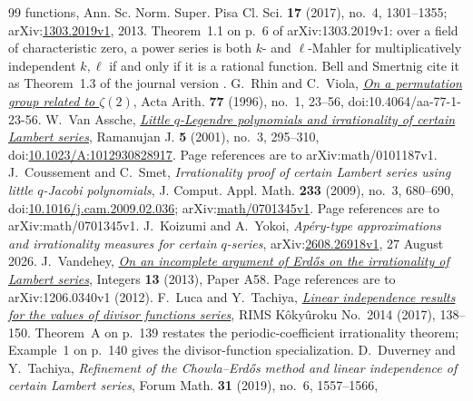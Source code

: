 \begin{thebibliography}{99}
{{  functions}}, Ann. Sc. Norm. Super. Pisa Cl. Sci. \textbf{17} (2017), no.~4,
  1301--1355; arXiv:\href{https://arxiv.org/abs/1303.2019v1}{1303.2019v1}, 2013.
  Theorem~1.1 on p.~6 of arXiv:1303.2019v1: over a field of characteristic
  zero, a power series is both \(k\)- and \(\ell\)-Mahler for multiplicatively
  independent \(k,\ell\) if and only if it is a rational function.  Bell and
  Smertnig cite it as Theorem~1.3 of the journal version
  \cite[Thm.~2.5, p.~5]{bellsmertnig2026}.
 G.~Rhin and C.~Viola,
  \href{https://geodesic.mathdoc.fr/articles/10.4064/aa-77-1-23-56/}
  {\emph{On a permutation group related to $\zeta(2)$}},
  Acta Arith. \textbf{77} (1996), no.~1, 23--56,
  doi:10.4064/aa-77-1-23-56.
 W.~Van Assche,
  \href{https://arxiv.org/abs/math/0101187v1}{\emph{Little \(q\)-Legendre
  polynomials and irrationality of certain Lambert series}},
  Ramanujan J. \textbf{5} (2001), no.~3, 295--310,
  doi:\href{https://doi.org/10.1023/A:1012930828917}{10.1023/A:1012930828917}.
  Page references are to arXiv:math/0101187v1.
 J.~Coussement and C.~Smet, \emph{Irrationality
  proof of certain Lambert series using little \(q\)-Jacobi polynomials},
  J. Comput. Appl. Math. \textbf{233} (2009), no.~3, 680--690,
  doi:\href{https://doi.org/10.1016/j.cam.2009.02.036}{10.1016/j.cam.2009.02.036};
  arXiv:\href{https://arxiv.org/abs/math/0701345v1}{math/0701345v1}.
  Page references are to arXiv:math/0701345v1.
 J.~Koizumi and A.~Yokoi, \emph{Ap\'ery-type
  approximations and irrationality measures for certain \(q\)-series},
  arXiv:\href{https://arxiv.org/abs/2608.26918v1}{2608.26918v1},
  27 August 2026.
 J.~Vandehey,
  \href{https://arxiv.org/abs/1206.0340v1}{\emph{On an incomplete argument of
  Erd\H{o}s on the irrationality of Lambert series}}, Integers
  \textbf{13} (2013), Paper A58. Page references are to
  arXiv:1206.0340v1 (2012).
 F.~Luca and Y.~Tachiya,
  \href{https://www.kurims.kyoto-u.ac.jp/~kyodo/kokyuroku/contents/pdf/2014-14.pdf}
  {\emph{Linear independence results for the values of divisor functions
  series}}, RIMS K\^oky\^uroku No.~2014 (2017), 138--150.
  Theorem~A on p.~139 restates the periodic-coefficient irrationality theorem;
  Example~1 on p.~140 gives the divisor-function specialization.
 D.~Duverney and Y.~Tachiya, \emph{Refinement of
  the Chowla--Erd\H{o}s method and linear independence of certain Lambert
  series}, Forum Math. \textbf{31} (2019), no.~6, 1557--1566,

\end{thebibliography}
